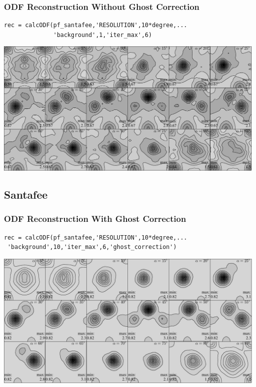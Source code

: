 \documentclass{beamer}
\begin{document}
\begin{frame}[fragile]
  \frametitle{ODF Reconstruction Without Ghost Correction}

\begin{lstlisting}
rec = calcODF(pf_santafee,'RESOLUTION',10*degree,...
              'background',1,'iter_max',6)
\end{lstlisting}

\includegraphics[width=\textwidth]{pic/rec_santafee}
  
\end{frame}
\subsection*{Santafee}

\begin{frame}[fragile]
  \frametitle{ODF Reconstruction With Ghost Correction}

\begin{lstlisting}
rec = calcODF(pf_santafee,'RESOLUTION',10*degree,...
 'background',10,'iter_max',6,'ghost_correction')
\end{lstlisting}

\includegraphics[width=\textwidth]{pic/rec_santafee_ghost_correction}
  
\end{frame}
\end{document}
